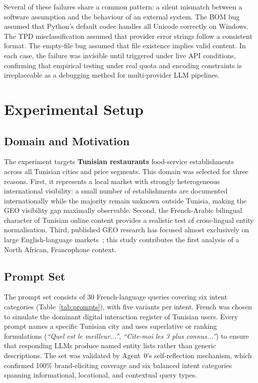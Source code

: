 Several of these failures share a common pattern: a silent mismatch between a
software assumption and the behaviour of an external system. The BOM bug assumed
that Python's default codec handles all Unicode correctly on Windows.
The TPD misclassification assumed that provider error strings follow a consistent
format. The empty-file bug assumed that file existence implies valid content.
In each case, the failure was invisible until triggered under live API conditions,
confirming that empirical testing under real quota and encoding constraints is
irreplaceable as a debugging method for multi-provider LLM pipelines.

\section{Experimental Setup}
\label{sec:setup}

\subsection{Domain and Motivation}

The experiment targets \textbf{Tunisian restaurants} food-service establishments
across all Tunisian cities and price segments. This domain was selected for three reasons.
First, it represents a local market with strongly heterogeneous international visibility:
a small number of establishments are documented internationally while the majority remain
unknown outside Tunisia, making the GEO visibility gap maximally observable.
Second, the French-Arabic bilingual character of Tunisian online content provides a
realistic test of cross-lingual entity normalisation.
Third, published GEO research has focused almost exclusively on large English-language
markets~\cite{aggarwal2023geo}; this study contributes the first analysis of a
North African, Francophone context.

\subsection{Prompt Set}

The prompt set consists of 30 French-language queries covering six intent categories
(Table~\ref{tab:prompts}), with five variants per intent.
French was chosen to simulate the dominant digital interaction register of Tunisian users.
Every prompt names a specific Tunisian city and uses superlative or ranking formulations
(\textit{``Quel est le meilleur...''}, \textit{``Cite-moi les 3 plus connus...''})
to ensure that responding LLMs produce named entity lists rather than generic descriptions.
The set was validated by Agent~0's self-reflection mechanism, which confirmed 100\%
brand-eliciting coverage and six balanced intent categories spanning informational,
locational, and contextual query types.

